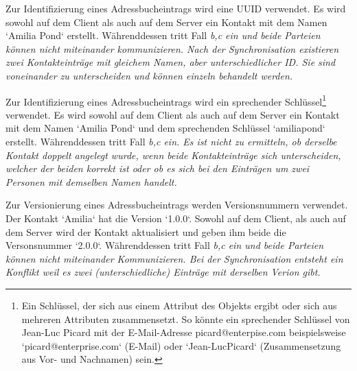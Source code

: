 %
%
\def \naturalkey {Ein Schlüssel, der sich aus einem Attribut des Objekts ergibt oder sich aus mehreren Attributen zusammensetzt. So könnte ein sprechender Schlüssel von Jean-Luc Picard mit der E-Mail-Adresse picard@enterpise.com beispielsweise `picard@enterprise.com` (E-Mail) oder `Jean-LucPicard` (Zusammensetzung aus Vor- und Nachnamen) sein.}
\def \logicalclock {Eine Logische Uhr ist eine Komponente die dazu dient, dem Datenobjekt einen eindeutigen Zeitstempel zuzuweisen. Die bekanntesten Verfahren für Logische Uhren in verteilten Systemen sind die Lamport-Uhr und die Vektoruhr. Beide verwenden Zähler die sich bei jedem Ereignis erhöhen. Einfach gesagt besteht die Lamport-Uhr aus einem Zeitstempel und einem Zähler, die Vektoruhr aus einem Zeitstempel und einem Vektor -- einer Liste aus Zählern.}
%
%
\begin{description}[leftmargin=0.5cm,style=nextline]
  \item[Szenario ID0:] 
  Zur Identifizierung eines Adressbucheintrags wird eine \gls{UUID} verwendet. Es wird sowohl auf dem Client als auch auf dem Server ein Kontakt mit dem Namen `Amilia Pond` erstellt. Währenddessen tritt Fall \it{b,c} ein und beide Parteien können nicht miteinander kommunizieren. Nach der Synchronisation existieren zwei Kontakteinträge mit gleichem Namen, aber unterschiedlicher ID. Sie sind voneinander zu unterscheiden und können einzeln behandelt werden.\\
  \item[Szenario ID1:]
  Zur Identifizierung eines Adressbucheintrags wird ein sprechender Schlüssel\footnote{\naturalkey} verwendet.
  Es wird sowohl auf dem Client als auch auf dem Server ein Kontakt mit dem Namen `Amilia Pond` und dem sprechenden Schlüssel `amiliapond` erstellt. Währenddessen tritt Fall \it{b,c} ein. Es ist nicht zu ermitteln, ob derselbe Kontakt doppelt angelegt wurde, wenn beide Kontakteinträge sich unterscheiden, welcher der beiden korrekt ist oder ob es sich bei den Einträgen um zwei Personen mit demselben Namen handelt.\\
  \item[Szenario V0:]
  Zur Versionierung eines Adressbucheintrags werden Versionsnummern verwendet. Der Kontakt `Amilia` hat die Version `1.0.0`. Sowohl auf dem Client, als auch auf dem Server wird der Kontakt aktualisiert und geben ihm beide die Versonsnummer `2.0.0`. Währenddessen tritt Fall \it{b,c} ein und beide Parteien können nicht miteinander Kommunizieren. Bei der Synchronisation entsteht ein Konflikt weil es zwei (unterschiedliche) Einträge mit derselben Verion gibt.\\

\end{description}
